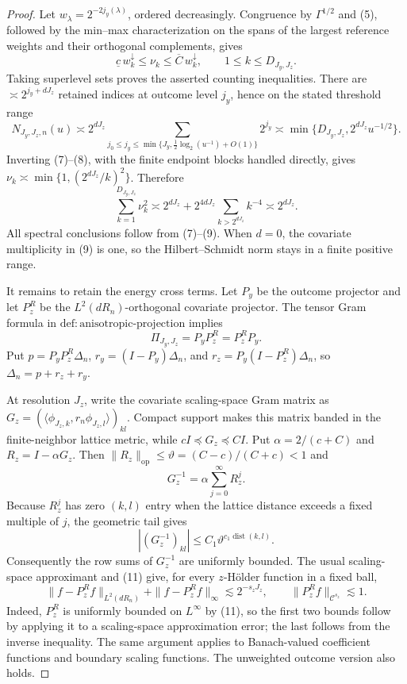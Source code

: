 \documentclass{article}
\begin{document}
\begin{proof}
Let \(w_\lambda=2^{-2j_y(\lambda)}\), ordered decreasingly. Congruence by \(\Gamma^{1/2}\) and (5), followed by the min--max characterization on the spans of the largest reference weights and their orthogonal complements, gives
\[
\underline c\,w_k^\downarrow\le\nu_k\le\overline C\,w_k^\downarrow,
\qquad 1\le k\le D_{J_y,J_z}.                                   \tag{7}
\]
Taking superlevel sets proves the asserted counting inequalities. There are \(\asymp2^{j_y+dJ_z}\) retained indices at outcome level \(j_y\), hence on the stated threshold range
\[
N_{J_y,J_z,n}(u)
\asymp2^{dJ_z}\sum_{j_0\le j_y\le\min\{J_y,\frac12\log_2(u^{-1})+O(1)\}}2^{j_y}
\asymp\min\{D_{J_y,J_z},2^{dJ_z}u^{-1/2}\}.                    \tag{8}
\]
Inverting (7)--(8), with the finite endpoint blocks handled directly, gives \(\nu_k\asymp\min\{1,(2^{dJ_z}/k)^2\}\). Therefore
\[
\sum_{k=1}^{D_{J_y,J_z}}\nu_k^2
\asymp2^{dJ_z}+2^{4dJ_z}\sum_{k>2^{dJ_z}}k^{-4}\asymp2^{dJ_z}. \tag{9}
\]
All spectral conclusions follow from (7)--(9). When \(d=0\), the covariate multiplicity in (9) is one, so the Hilbert--Schmidt norm stays in a finite positive range.

It remains to retain the energy cross terms. Let \(P_y\) be the outcome projector and let \(P_z^R\) be the \(L^2(dR_n)\)-orthogonal covariate projector. The tensor Gram formula in \(\mathrm{def{:}anisotropic\text{-}projection}\) implies
\[
\Pi_{J_y,J_z}=P_yP_z^R=P_z^RP_y.                                \tag{10}
\]
Put \(p=P_yP_z^R\Delta_n\), \(r_y=(I-P_y)\Delta_n\), and \(r_z=P_y(I-P_z^R)\Delta_n\), so \(\Delta_n=p+r_z+r_y\).

At resolution \(J_z\), write the covariate scaling-space Gram matrix as \(G_z=(\langle\phi_{J_z,k},r_n\phi_{J_z,l}\rangle)_{kl}\). Compact support makes this matrix banded in the finite-neighbor lattice metric, while \(cI\preceq G_z\preceq CI\). Put \(\alpha=2/(c+C)\) and \(R_z=I-\alpha G_z\). Then \(\|R_z\|_{\mathrm{op}}\le\vartheta=(C-c)/(C+c)<1\) and
\[
G_z^{-1}=\alpha\sum_{j=0}^{\infty}R_z^j.
\]
Because \(R_z^j\) has zero \((k,l)\) entry when the lattice distance exceeds a fixed multiple of \(j\), the geometric tail gives
\[
|(G_z^{-1})_{kl}|\le C_1\vartheta^{c_1\operatorname{dist}(k,l)}. \tag{11}
\]
Consequently the row sums of \(G_z^{-1}\) are uniformly bounded. The usual scaling-space approximant and (11) give, for every \(z\)-H\"older function in a fixed ball,
\[
\|f-P_z^Rf\|_{L^2(dR_n)}+\|f-P_z^Rf\|_\infty\lesssim2^{-s_zJ_z},
\qquad \|P_z^Rf\|_{\mathcal C^{s_z}}\lesssim1.                 \tag{12}
\]
Indeed, \(P_z^R\) is uniformly bounded on \(L^\infty\) by (11), so the first two bounds follow by applying it to a scaling-space approximation error; the last follows from the inverse inequality. The same argument applies to Banach-valued coefficient functions and boundary scaling functions. The unweighted outcome version also holds.


\end{proof}
\end{document}
